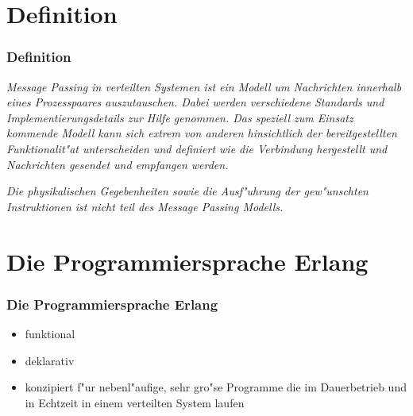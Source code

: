 \documentclass[aspectratio=169]{beamer}
\begin{document}
\section{Definition}

\begin{frame}

\frametitle{Definition}

\begin{center}
\textit{Message Passing in verteilten Systemen ist ein Modell um Nachrichten innerhalb eines Prozesspaares auszutauschen. Dabei werden verschiedene Standards und Implementierungsdetails zur Hilfe genommen. Das speziell zum Einsatz kommende Modell kann sich extrem von anderen hinsichtlich der bereitgestellten Funktionalit"at unterscheiden und definiert wie die Verbindung hergestellt und Nachrichten gesendet und empfangen werden.}
\end{center}
\pause
\begin{center}
\textit{Die physikalischen Gegebenheiten sowie die Ausf"uhrung der gew"unschten Instruktionen ist nicht teil des Message Passing Modells.}
\end{center}

\end{frame}

\section{Die Programmiersprache Erlang}

\begin{frame}

\frametitle{Die Programmiersprache Erlang}

\begin{itemize}
\item funktional
\pause
\item deklarativ
\pause
\item konzipiert f"ur nebenl"aufige, sehr gro"se Programme die im Dauerbetrieb und in Echtzeit in einem verteilten System laufen
\end{itemize}

\begin{flushright}
\cite{Armstrong96erlang}\\
\cite{erl_history}
\end{flushright}

\end{frame}
\end{document}

